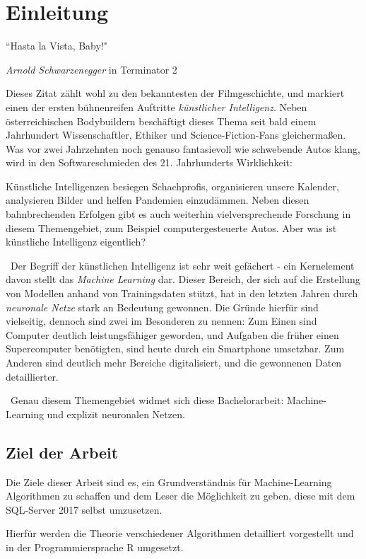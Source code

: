 \chapter{Einleitung}
\label{cha:Einleitung}
\setlength{\epigraphwidth}{4in}
\epigraph{“Hasta la Vista, Baby!"}{\textit{Arnold Schwarzenegger} \textup{ in Terminator 2}}

Dieses Zitat zählt wohl zu den bekanntesten der Filmgeschichte, und markiert einen der ersten bühnenreifen Auftritte \textit{künstlicher Intelligenz}. Neben österreichischen Bodybuildern beschäftigt dieses Thema seit bald einem Jahrhundert Wissenschaftler, Ethiker und Science-Fiction-Fans gleichermaßen. Was vor zwei Jahrzehnten noch genauso fantasievoll wie schwebende Autos klang, wird in den Softwareschmieden des 21. Jahrhunderts Wirklichkeit: 

Künstliche Intelligenzen besiegen Schachprofis, organisieren unsere Kalender, analysieren Bilder und helfen Pandemien einzudämmen. Neben diesen bahnbrechenden Erfolgen gibt es auch weiterhin vielversprechende Forschung in diesem Themengebiet, zum Beispiel computergesteuerte Autos. Aber was ist künstliche Intelligenz eigentlich?

~\newline Der Begriff der künstlichen Intelligenz ist sehr weit gefächert - ein Kernelement davon stellt das \textit{Machine Learning} dar. Dieser Bereich, der sich auf die Erstellung von Modellen anhand von Trainingsdaten stützt, hat in den letzten Jahren durch \textit{neuronale Netze} stark an Bedeutung gewonnen. Die Gründe hierfür sind vielseitig, dennoch sind zwei im Besonderen zu nennen: Zum Einen sind Computer deutlich leistungsfähiger geworden, und Aufgaben die früher einen Supercomputer benötigten, sind heute durch ein Smartphone umsetzbar. Zum Anderen sind deutlich mehr Bereiche digitalisiert, und die gewonnenen Daten detaillierter. 

~\newline Genau diesem Themengebiet widmet sich diese Bachelorarbeit: Machine-Learning und explizit neuronalen Netzen. 
\section{Ziel der Arbeit}
\label{sec:ZielDerArbeit}
Die Ziele dieser Arbeit sind es, ein Grundverständnis für Machine-Learning Algorithmen zu schaffen und dem Leser die Möglichkeit zu geben, diese mit dem SQL-Server 2017 selbst umzusetzen. 

Hierfür werden die Theorie verschiedener Algorithmen detailliert vorgestellt und in der Programmiersprache R umgesetzt. 

